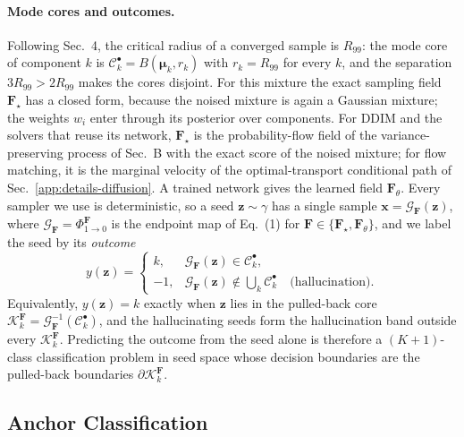 \paragraph{Mode cores and outcomes.}
Following Sec.~4, the critical radius of a converged sample is $R_{99}$: the mode core of
component $k$ is $\mathcal{C}_k^\bullet = B(\boldsymbol{\mu}_k, r_k)$ with $r_k = R_{99}$ for every
$k$, and the separation $3R_{99} > 2R_{99}$ makes the cores disjoint. For this mixture the exact
sampling field $\boldsymbol{F}_\star$ has a closed form, because the noised mixture is again a
Gaussian mixture; the weights $w_i$ enter through its posterior over components. For DDIM and the
solvers that reuse its network, $\boldsymbol{F}_\star$ is the probability-flow field of the
variance-preserving process of Sec.~B with the exact score of the noised mixture; for flow
matching, it is the marginal velocity of the optimal-transport conditional path of
Sec.~\ref{app:details-diffusion}. A trained network gives the learned field
$\boldsymbol{F}_\theta$. Every sampler we use is deterministic, so a seed
$\boldsymbol{z} \sim \gamma$ has a single sample
$\boldsymbol{x} = \mathcal{G}_{\boldsymbol{F}}(\boldsymbol{z})$, where
$\mathcal{G}_{\boldsymbol{F}} = \Phi^{\boldsymbol{F}}_{1 \to 0}$ is the endpoint map of Eq.~(1) for
$\boldsymbol{F} \in \{\boldsymbol{F}_\star, \boldsymbol{F}_\theta\}$, and we label the seed by its
\emph{outcome}
\begin{equation}
    y(\boldsymbol{z}) =
    \begin{cases}
        k,  & \mathcal{G}_{\boldsymbol{F}}(\boldsymbol{z}) \in \mathcal{C}_k^\bullet, \\
        -1, & \mathcal{G}_{\boldsymbol{F}}(\boldsymbol{z}) \notin \bigcup_{k} \mathcal{C}_k^\bullet
              \quad \text{(hallucination)}.
    \end{cases}
\end{equation}
Equivalently, $y(\boldsymbol{z}) = k$ exactly when $\boldsymbol{z}$ lies in the pulled-back core
$\mathcal{K}_k^{\boldsymbol{F}} = \mathcal{G}_{\boldsymbol{F}}^{-1}(\mathcal{C}_k^\bullet)$, and the
hallucinating seeds form the hallucination band outside every $\mathcal{K}_k^{\boldsymbol{F}}$.
Predicting the outcome from the seed alone is therefore a $(K+1)$-class classification problem in
seed space whose decision boundaries are the pulled-back boundaries
$\partial\mathcal{K}_k^{\boldsymbol{F}}$.


\subsection{Anchor Classification}
\label{app:anchor-class}

